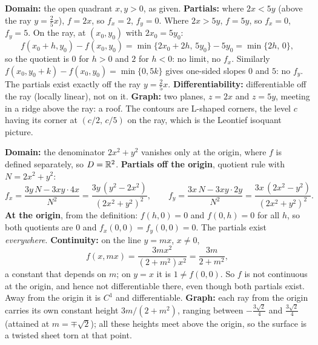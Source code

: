 \begin{solutions}
  \item \textbf{Domain:} the open quadrant $x,y>0$, as given.
        \textbf{Partials:} where $2x<5y$ (above the ray
        $y=\tfrac25x$), $f=2x$, so $f_{x}=2$, $f_{y}=0$. Where $2x>5y$,
        $f=5y$, so $f_{x}=0$, $f_{y}=5$. On the ray, at $(x_{0},y_{0})$ with
        $2x_{0}=5y_{0}$:
        \[
          f(x_{0}+h,y_{0})-f(x_{0},y_{0})=\min\{2x_{0}+2h,\,5y_{0}\}-5y_{0}
          =\min\{2h,\,0\},
        \]
        so the quotient is $0$ for $h>0$ and $2$ for $h<0$: no limit, no
        $f_{x}$. Similarly $f(x_{0},y_{0}+k)-f(x_{0},y_{0})=\min\{0,5k\}$
        gives one-sided slopes $0$ and $5$: no $f_{y}$. The partials exist
        exactly off the ray $y=\tfrac25x$. \textbf{Differentiability:}
        differentiable off the ray (locally linear), not on it.
        \textbf{Graph:} two planes, $z=2x$ and $z=5y$, meeting in a ridge
        above the ray: a roof. The contours are L-shaped corners, the level
        $c$ having its corner at $(c/2,\,c/5)$ on the ray, which is the
        Leontief isoquant picture.

  \item \textbf{Domain:} the denominator $2x^{2}+y^{2}$ vanishes only at
        the origin, where $f$ is defined separately, so $D=\mathbb{R}^{2}$.
        \textbf{Partials off the origin}, quotient rule with
        $N=2x^{2}+y^{2}$:
        \[
          f_{x}=\frac{3y\,N-3xy\cdot4x}{N^{2}}
               =\frac{3y\,(y^{2}-2x^{2})}{(2x^{2}+y^{2})^{2}},\qquad
          f_{y}=\frac{3x\,N-3xy\cdot2y}{N^{2}}
               =\frac{3x\,(2x^{2}-y^{2})}{(2x^{2}+y^{2})^{2}} .
        \]
        \textbf{At the origin}, from the definition: $f(h,0)=0$ and
        $f(0,h)=0$ for all $h$, so both quotients are $0$ and
        $f_{x}(0,0)=f_{y}(0,0)=0$. The partials exist \emph{everywhere}.
        \textbf{Continuity:} on the line $y=mx$, $x\neq0$,
        \[
          f(x,mx)=\frac{3mx^{2}}{(2+m^{2})x^{2}}=\frac{3m}{2+m^{2}},
        \]
        a constant that depends on $m$; on $y=x$ it is $1\neq f(0,0)$. So
        $f$ is not continuous at the origin, and hence not differentiable
        there, even though both partials exist. Away from the origin it is
        $C^{1}$ and differentiable. \textbf{Graph:} each ray from the origin
        carries its own constant height $3m/(2+m^{2})$, ranging between
        $-\tfrac{3\sqrt2}{4}$ and $\tfrac{3\sqrt2}{4}$ (attained at
        $m=\mp\sqrt2$); all these heights meet above the origin, so the
        surface is a twisted sheet torn at that point.


\end{solutions}
